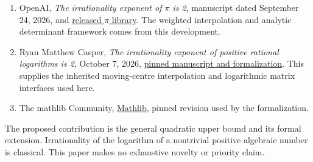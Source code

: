 \documentclass[11pt]{article}
\providecommand{\tightlist}{\setlength{\itemsep}{0pt}\setlength{\parskip}{0pt}}
\begin{document}
\begin{enumerate}
\def\labelenumi{\arabic{enumi}.}
\tightlist
\item
  OpenAI, \emph{The irrationality exponent of \(\pi\) is 2}, manuscript
  dated September 24, 2026, and
  \href{https://github.com/openai/math/tree/adc7f1241b42e322a6451854ab7e4b4c146bf78a/preprints/The-irrationality-exponent-of-pi-is-2-September-24-2026}{released
  \(\pi\) library}. The weighted interpolation and analytic determinant
  framework comes from this development.
\item
  Ryan Matthew Casper, \emph{The irrationality exponent of positive
  rational logarithms is 2}, October 7, 2026,
  \href{https://github.com/Mattie/math/tree/0cfe10002ea95c45721b93d18bffbe2c3bbbcbbd/preprints/The-irrationality-exponent-of-positive-rational-logarithms-is-2-October-7-2026}{pinned
  manuscript and formalization}. This supplies the inherited
  moving-centre interpolation and logarithmic matrix interfaces used
  here.
\item
  The mathlib Community,
  \href{https://github.com/leanprover-community/mathlib4/tree/d13f23b723b8a846827a245b89c10fc7d3f11612}{Mathlib},
  pinned revision used by the formalization.
\end{enumerate}

The proposed contribution is the general quadratic upper bound and its
formal extension. Irrationality of the logarithm of a nontrivial
positive algebraic number is classical. This paper makes no exhaustive
novelty or priority claim.
\end{document}
